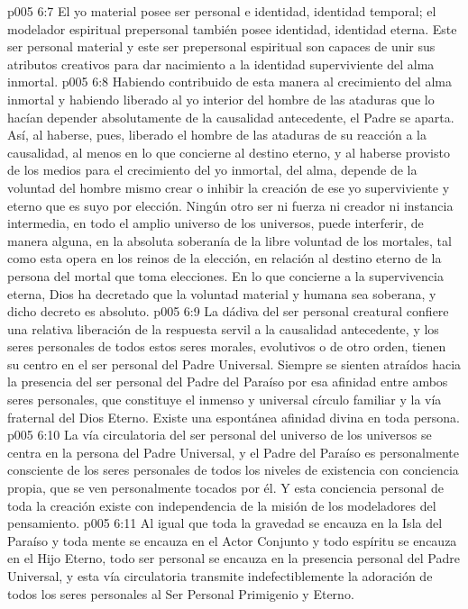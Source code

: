 \vs p005 6:7 \pc El yo material posee ser personal e identidad, identidad temporal; el modelador espiritual prepersonal también posee identidad, identidad eterna. Este ser personal material y este ser prepersonal espiritual son capaces de unir sus atributos creativos para dar nacimiento a la identidad superviviente del alma inmortal.
\vs p005 6:8 Habiendo contribuido de esta manera al crecimiento del alma inmortal y habiendo liberado al yo interior del hombre de las ataduras que lo hacían depender absolutamente de la causalidad antecedente, el Padre se aparta. Así, al haberse, pues, liberado el hombre de las ataduras de su reacción a la causalidad, al menos en lo que concierne al destino eterno, y al haberse provisto de los medios para el crecimiento del yo inmortal, del alma, depende de la voluntad del hombre mismo crear o inhibir la creación de ese yo superviviente y eterno que es suyo por elección. Ningún otro ser ni fuerza ni creador ni instancia intermedia, en todo el amplio universo de los universos, puede interferir, de manera alguna, en la absoluta soberanía de la libre voluntad de los mortales, tal como esta opera en los reinos de la elección, en relación al destino eterno de la persona del mortal que toma elecciones. En lo que concierne a la supervivencia eterna, Dios ha decretado que la voluntad material y humana sea soberana, y dicho decreto es absoluto.
\vs p005 6:9 \pc La dádiva del ser personal creatural confiere una relativa liberación de la respuesta servil a la causalidad antecedente, y los seres personales de todos estos seres morales, evolutivos o de otro orden, tienen su centro en el ser personal del Padre Universal. Siempre se sienten atraídos hacia la presencia del ser personal del Padre del Paraíso por esa afinidad entre ambos seres personales, que constituye el inmenso y universal círculo familiar y la vía fraternal del Dios Eterno. Existe una espontánea afinidad divina en toda persona.
\vs p005 6:10 \pc La vía circulatoria del ser personal del universo de los universos se centra en la persona del Padre Universal, y el Padre del Paraíso es personalmente consciente de los seres personales de todos los niveles de existencia con conciencia propia, que se ven personalmente tocados por él. Y esta conciencia personal de toda la creación existe con independencia de la misión de los modeladores del pensamiento.
\vs p005 6:11 \pc Al igual que toda la gravedad se encauza en la Isla del Paraíso y toda mente se encauza en el Actor Conjunto y todo espíritu se encauza en el Hijo Eterno, todo ser personal se encauza en la presencia personal del Padre Universal, y esta vía circulatoria transmite indefectiblemente la adoración de todos los seres personales al Ser Personal Primigenio y Eterno.
